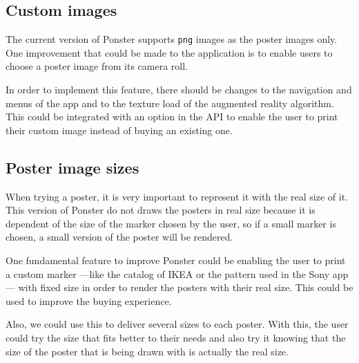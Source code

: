 \subsection{Custom images}
The current version of Ponster supports \texttt{png} images as the poster images
only. One improvement that could be made to the application is to enable users to
choose a poster image from its camera roll.

In order to implement this feature, there should be changes to the navigation and
menus of the app and to the texture load of the augmented reality algorithm. This
could be integrated with an option in the API to enable the user to print their
custom image instead of buying an existing one.

\subsection{Poster image sizes}
When trying a poster, it is very important to represent it with the real size of
it. This version of Ponster do not draws the posters in real size because it is
dependent of the size of the marker chosen by the user, so if a small marker is
chosen, a small version of the poster will be rendered.

One fundamental feature to improve Ponster could be enabling the user to print a
custom marker ---like the catalog of IKEA or the pattern used in the Sony app---
with fixed size in order to render the posters with their real size. This could be
used to improve the buying experience.

Also, we could use this to deliver several sizes to each poster. With this, the user
could try the size that fits better to their needs and also try it knowing that the
size of the poster that is being drawn with is actually the real size.
